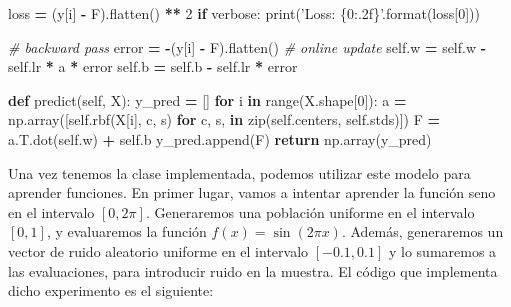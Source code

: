\documentclass[
  a4paper,
,tablecaptionabove
]{scrartcl}
\newenvironment{Shaded}{\begin{snugshade}}{\end{snugshade}}
\newcommand{\BuiltInTok}[1]{#1}
\newcommand{\CommentTok}[1]{\textcolor[rgb]{0.56,0.35,0.01}{\textit{#1}}}
\newcommand{\ControlFlowTok}[1]{\textcolor[rgb]{0.13,0.29,0.53}{\textbf{#1}}}
\newcommand{\DecValTok}[1]{\textcolor[rgb]{0.00,0.00,0.81}{#1}}
\newcommand{\KeywordTok}[1]{\textcolor[rgb]{0.13,0.29,0.53}{\textbf{#1}}}
\newcommand{\NormalTok}[1]{#1}
\newcommand{\OperatorTok}[1]{\textcolor[rgb]{0.81,0.36,0.00}{\textbf{#1}}}
\newcommand{\SpecialCharTok}[1]{\textcolor[rgb]{0.00,0.00,0.00}{#1}}
\newcommand{\StringTok}[1]{\textcolor[rgb]{0.31,0.60,0.02}{#1}}
\newcommand{\VariableTok}[1]{\textcolor[rgb]{0.00,0.00,0.00}{#1}}
\begin{document}
\begin{Shaded}
\begin{Highlighting}[]
\NormalTok{                loss }\OperatorTok{=}\NormalTok{ (y[i] }\OperatorTok{-}\NormalTok{ F).flatten() }\OperatorTok{**} \DecValTok{2}
                \ControlFlowTok{if}\NormalTok{ verbose:}
                    \BuiltInTok{print}\NormalTok{(}\StringTok{'Loss: }\SpecialCharTok{\{0:.2f\}}\StringTok{'}\NormalTok{.}\BuiltInTok{format}\NormalTok{(loss[}\DecValTok{0}\NormalTok{]))}

                \CommentTok{# backward pass}
\NormalTok{                error }\OperatorTok{=} \OperatorTok{-}\NormalTok{(y[i] }\OperatorTok{-}\NormalTok{ F).flatten()}
                \CommentTok{# online update}
                \VariableTok{self}\NormalTok{.w }\OperatorTok{=} \VariableTok{self}\NormalTok{.w }\OperatorTok{-} \VariableTok{self}\NormalTok{.lr }\OperatorTok{*}\NormalTok{ a }\OperatorTok{*}\NormalTok{ error}
                \VariableTok{self}\NormalTok{.b }\OperatorTok{=} \VariableTok{self}\NormalTok{.b }\OperatorTok{-} \VariableTok{self}\NormalTok{.lr }\OperatorTok{*}\NormalTok{ error}

    \KeywordTok{def}\NormalTok{ predict(}\VariableTok{self}\NormalTok{, X):}
\NormalTok{        y_pred }\OperatorTok{=}\NormalTok{ []}
        \ControlFlowTok{for}\NormalTok{ i }\KeywordTok{in} \BuiltInTok{range}\NormalTok{(X.shape[}\DecValTok{0}\NormalTok{]):}
\NormalTok{            a }\OperatorTok{=}\NormalTok{ np.array([}\VariableTok{self}\NormalTok{.rbf(X[i], c, s)}
                          \ControlFlowTok{for}\NormalTok{ c, s, }\KeywordTok{in} \BuiltInTok{zip}\NormalTok{(}\VariableTok{self}\NormalTok{.centers, }\VariableTok{self}\NormalTok{.stds)])}
\NormalTok{            F }\OperatorTok{=}\NormalTok{ a.T.dot(}\VariableTok{self}\NormalTok{.w) }\OperatorTok{+} \VariableTok{self}\NormalTok{.b}
\NormalTok{            y_pred.append(F)}
        \ControlFlowTok{return}\NormalTok{ np.array(y_pred)}
\end{Highlighting}
\end{Shaded}

Una vez tenemos la clase implementada, podemos utilizar este modelo para
aprender funciones. En primer lugar, vamos a intentar aprender la
función seno en el intervalo \([0, 2\pi]\). Generaremos una población
uniforme en el intervalo \([0,1]\), y evaluaremos la función
\(f(x) = \sin(2 \pi x)\). Además, generaremos un vector de ruido
aleatorio uniforme en el intervalo \([-0.1, 0.1]\) y lo sumaremos a las
evaluaciones, para introducir ruido en la muestra. El código que
implementa dicho experimento es el siguiente:
\end{document}
